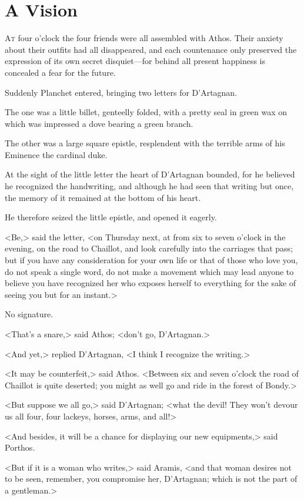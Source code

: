 
\chapter{A Vision}

\lettrine{A}{t} four o'clock the four friends were all assembled with Athos. Their anxiety about their outfits had all disappeared, and each countenance only preserved the expression of its own secret disquiet—for behind all present happiness is concealed a fear for the future. 

Suddenly Planchet entered, bringing two letters for D'Artagnan. 

The one was a little billet, genteelly folded, with a pretty seal in green wax on which was impressed a dove bearing a green branch. 

The other was a large square epistle, resplendent with the terrible arms of his Eminence the cardinal duke. 

At the sight of the little letter the heart of D'Artagnan bounded, for he believed he recognized the handwriting, and although he had seen that writing but once, the memory of it remained at the bottom of his heart. 

He therefore seized the little epistle, and opened it eagerly. 

<Be,> said the letter, <on Thursday next, at from six to seven o'clock in the evening, on the road to Chaillot, and look carefully into the carriages that pass; but if you have any consideration for your own life or that of those who love you, do not speak a single word, do not make a movement which may lead anyone to believe you have recognized her who exposes herself to everything for the sake of seeing you but for an instant.> 

No signature. 

<That's a snare,> said Athos; <don't go, D'Artagnan.> 

<And yet,> replied D'Artagnan, <I think I recognize the writing.> 

<It may be counterfeit,> said Athos. <Between six and seven o'clock the road of Chaillot is quite deserted; you might as well go and ride in the forest of Bondy.> 

<But suppose we all go,> said D'Artagnan; <what the devil! They won't devour us all four, four lackeys, horses, arms, and all!> 

<And besides, it will be a chance for displaying our new equipments,> said Porthos. 

<But if it is a woman who writes,> said Aramis, <and that woman desires not to be seen, remember, you compromise her, D'Artagnan; which is not the part of a gentleman.> 


